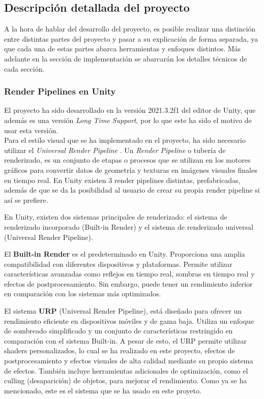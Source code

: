 \subsection{Descripción detallada del proyecto }

A la hora de hablar del desarrollo del proyecto, es posible realizar una distinción entre
 distintas partes del proyecto y pasar a su explicación de forma separada, ya que cada una de estas 
 partes abarca herramientas y enfoques distintos. Más adelante en la sección de implementación se abarcarán los detalles técnicos de cada sección.

\subsubsection{Render Pipelines en Unity}

El proyecto ha sido desarrollado en la versión 2021.3.2f1 \cite{UnityLTS} del editor de Unity, que además es una versión \textit{Long Time Support}, por lo que este ha sido el motivo de usar esta versión.\\

Para el estilo visual que se ha implementado en el proyecto, ha sido necesario utilizar el \textit{Universal Render Pipeline} \cite{URP}. Un \textit{Render Pipeline} \cite{RenderPipeline} o tubería de renderizado, es un conjunto de etapas o procesos que se utilizan en los motores gráficos para convertir datos de geometría y texturas en imágenes visuales finales en tiempo real. En Unity existen 3 render pipelines distintas, prefabricadas, además de que se da la posibilidad al usuario de crear su propia render pipeline si así se prefiere.

En Unity, existen dos sistemas principales de renderizado: el sistema de renderizado incorporado (Built-in Render) y el sistema de renderizado universal (Universal Render Pipeline).

El \textbf{Built-in Render} es el predeterminado en Unity. Proporciona una amplia compatibilidad con diferentes dispositivos y plataformas. Permite utilizar características avanzadas como reflejos en tiempo real, sombras en tiempo real y efectos de postprocesamiento. Sin embargo, puede tener un rendimiento inferior en comparación con los sistemas más optimizados.

El sistema \textbf{URP} (Universal Render Pipeline), está diseñado para ofrecer un rendimiento eficiente en dispositivos móviles y de gama baja. Utiliza un enfoque de sombreado simplificado y un conjunto de características restringido en comparación con el sistema Built-in. A pesar de esto, el URP permite utilizar shaders personalizados, lo cual se ha realizado en este proyecto, efectos de postprocesamiento y efectos visuales de alta calidad mediante su propio sistema de efectos. También incluye herramientas adicionales de optimización, como el culling (desaparición) de objetos, para mejorar el rendimiento. Como ya se ha mencionado, este es el sistema que se ha usado en este proyeto.

